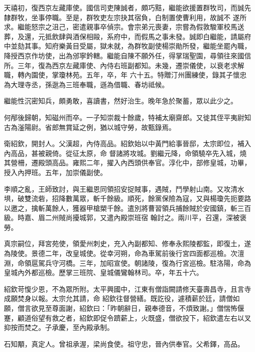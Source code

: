 \begin{pinyinscope}
 天禧初，復西京左藏庫使。國信司吏陳誠者，頗巧黠，繼能欲援置群牧司，而誠先隸群牧，坐事停職。至是，群牧吏左宗抉其宿負，白制置使曹利用，故誠不
 遂所求。繼能怒宗之沮己，密遣親事卒偵宗。會宗弟元喪妻，宗嘗為假敦駿軍校馬送葬，及還，元抵飲肆與酒保相毆，系府中，而假馬之事未發。誠即白繼能，請屬府中並劾其事。知府樂黃目受屬，獄未就，為群牧副使楊崇勛所發，繼能坐罷內職，降授西京作坊使，出為邠寧鈐轄。繼能自陳不願外任，得掌瑞聖園，尋領往來國信所。三年，復為西京左藏庫使、內侍右班副都知。未幾，遷崇儀使，以衰老求解職，轉內園使，掌瓊林苑。五年，卒，年
 六十五。特贈汀州團練使，錄其子懷忠為大理寺丞，孫逖為三班奉職，遜為借職、春坊祗候。



 繼能性沉密知兵，頗勇敢，喜讀書，然好治生。晚年急於聚蓄，眾以此少之。



 何邴後歸朝，知磁州而卒。一子知崇裁十餘歲，特補太廟齋郎。又徙其侄平夷尉知古為滏陽尉。省郎無賞延之例，猶以城守勞，故甄錄焉。



 衛紹欽，開封人。父漢超，內侍高品。紹欽始以中黃門給事晉邸，太宗即位，補入內高品，甚被親倚。從征太原，命
 督諸將攻城。劉繼元降，命領驍卒先入城，燒其營柵，遷殿頭高品。雍熙二年，擢入內西頭供奉官。淳化中，部修皇城，功畢，授入內押班。五年，加崇儀副使。



 李順之亂，王師致討，與王繼恩同領招安捉賊事，遇賊，鬥學射山南。又攻清水埧，破雙流砦，招降數萬眾，斬千餘級。順死，餘黨保險為寇，又與楊瓊先扼要路以邀之，擒斬萬餘人，獲器甲槍槊千餘。遣別將曹習領兵捕餘賊於安國鎮，斬三百級。時嘉、眉二州賊尚擾城郭，又遣內殿崇班宿
 翰討之。兩川平，召還，深被褒勞。



 真宗嗣位，拜宮苑使，領愛州刺史，充入內副都知、修奉永熙陵都監，即復土，遂為陵使。景德二年，改皇城使。從幸河朔，命為車駕前後行宮四面都巡檢。次澶淵，命領扈駕兵守河橋。三年，加昭宣使。朝諸陵，復為行宮巡檢。駐洛陽，命為皇城內外都巡檢。歷掌三班院、皇城儀鸞翰林司。卒，年五十六。



 紹欽苛愎少恩，不為眾所附。太平興國中，江東有僧詣闕請修天臺壽昌寺，且言寺成願焚身以報。太宗允其請，命
 紹欽往督營繕。既訖役，遽積薪於廷，請僧如願，僧言欲見至尊面謝，紹欽曰：「昨朝辭日，親奉德音，不煩致謝。」僧惴怖偃蹇，顧道俗望有救之者，紹欽即促令躋薪上，火既盛，僧欲投下，紹欽遣左右以叉抑按而焚之。子承慶，至內殿承制。



 石知顒，真定人。曾祖承渥，梁尚食使。祖守忠，晉內供奉官。父希鐸，高品。




\end{pinyinscope}

